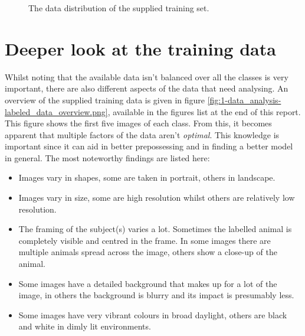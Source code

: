 \begin{figure}[H]
    \centering
    \captionsetup{width=0.65\linewidth}
    \captionsetup{justification=centering}
    \caption{The data distribution of the supplied training set.}
    \label{fig:1-data_analysis-labeled_data_distribution}
\end{figure}


\section{Deeper look at the training data}
\label{section:DA_deeper_look_data}

Whilst noting that the available data isn't balanced over all the classes is very important, there are also different aspects of the data that need analysing. 
An overview of the supplied training data is given in figure \ref{fig:1-data_analysis-labeled_data_overview.png}, available in the figures list at the end of this report.
This figure shows the first five images of each class.
From this, it becomes apparent that multiple factors of the data aren't \emph{optimal}.
This knowledge is important since it can aid in better prepossessing and in finding a better model in general.
The most noteworthy findings are listed here:
\begin{itemize}
    \item Images vary in shapes, some are taken in portrait, others in landscape.
    \item Images vary in size, some are high resolution whilst others are relatively low resolution.
    \item The framing of the subject(s) varies a lot. Sometimes the labelled animal is completely visible and centred in the frame. In some images there are multiple animals spread across the image, others show a close-up of the animal.
    \item Some images have a detailed background that makes up for a lot of the image, in others the background is blurry and its impact is presumably less.
    \item Some images have very vibrant colours in broad daylight, others are black and white in dimly lit environments.
\end{itemize}

